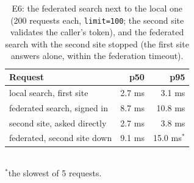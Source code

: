 \begin{table}[t]
\centering
\caption{E6: the federated search next to the local one (200 requests each, \texttt{limit=100}; the second site validates the caller's token), and the federated search with the second site stopped (the first site answers alone, within the federation timeout).}
\label{tab:federation}
\small
\begin{tabular}{@{}lrr@{}}
\toprule
Request & p50 & p95 \\
\midrule
local search, first site & 2.7 ms & 3.1 ms \\
federated search, signed in & 8.7 ms & 10.8 ms \\
second site, asked directly & 2.7 ms & 3.8 ms \\
federated, second site down & 9.1 ms & 15.0 ms$^{*}$ \\
\bottomrule
\end{tabular}
\\[2pt]{\footnotesize $^{*}$the slowest of 5 requests.}
\end{table}
